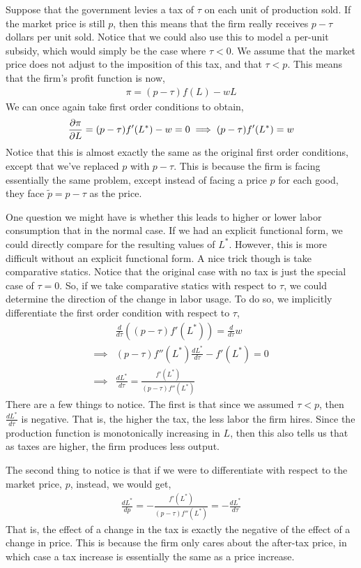 Suppose that the government levies a tax of $\tau$ on each unit of production sold. If the market price is still $p$, then this means that the firm really receives $p - \tau$ dollars per unit sold. Notice that we could also use this to model a per-unit subsidy, which would simply be the case where $\tau < 0$. We assume that the market price does not adjust to the imposition of this tax, and that $\tau < p$.  This means that the firm's profit function is now,
\begin{align*}
    \pi = (p - \tau) f(L) - w L
\end{align*}
We can once again take first order conditions to obtain,
\begin{align*}
    \frac{\partial \pi}{\partial L} = (p - \tau) f'(L^*) - w = 0 \implies (p - \tau) f'(L^*) = w
\end{align*}
Notice that this is almost exactly the same as the original first order conditions, except that we've replaced $p$ with $p - \tau$. This is because the firm is facing essentially the same problem, except instead of facing a price $p$ for each good, they face $\tilde{p} = p - \tau$ as the price. 

One question we might have is whether this leads to higher or lower labor consumption that in the normal case. If we had an explicit functional form, we could directly compare for the resulting values of $L^*$. However, this is more difficult without an explicit functional form. A nice trick though is take comparative statics. Notice that the original case with no tax is just the special case of $\tau = 0$. So, if we take comparative statics with respect to $\tau$, we could determine the direction of the change in labor usage. To do so, we implicitly differentiate the first order condition with respect to $\tau$,
\begin{align*}
    &\frac{d}{d\tau}\left((p - \tau) f'(L^*)\right) = \frac{d}{d\tau} w \\
    \implies& (p - \tau) f''(L^*) \frac{dL^*}{d\tau}- f'(L^*) = 0 \\
    \implies& \frac{dL^*}{d\tau} = \frac{f'(L^*)}{(p - \tau) f''(L^*)} 
\end{align*}
There are a few things to notice. The first is that since we assumed $\tau < p$, then $\frac{dL^*}{d\tau}$ is negative. That is, the higher the tax, the less labor the firm hires. Since the production function is monotonically increasing in $L$, then this also tells us that as taxes are higher, the firm produces less output.

The second thing to notice is that if we were to differentiate with respect to the market price, $p$, instead, we would get,
\begin{align*}
    \frac{dL^*}{dp} = - \frac{f'(L^*)}{(p - \tau) f''(L^*)} = -\frac{dL^*}{d\tau}
\end{align*}
That is, the effect of a change in the tax is exactly the negative of the effect of a change in price. This is because the firm only cares about the after-tax price, in which case a tax increase is essentially the same as a price increase.

